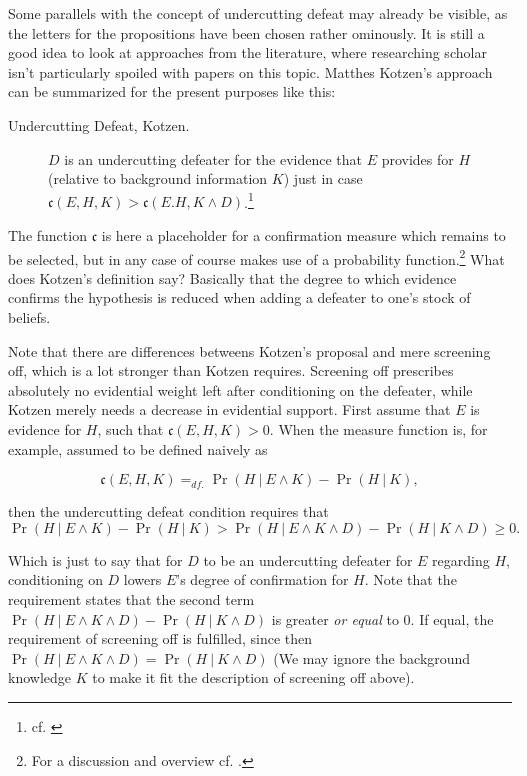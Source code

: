 \documentclass[11pt, a4paper]{scrartcl}
\newcommand{\given}[1][]{\:#1\vert\:}
\renewcommand{\i}[1]{\emph{#1}}
\begin{document}
Some parallels with the concept of undercutting defeat may already be visible, as the letters for the propositions have been chosen rather ominously. It is still a good idea to look at approaches from the literature, where researching scholar isn't particularly spoiled with papers on this topic. Matthes Kotzen's approach can be summarized for the present purposes like this:  
\begin{description}
    \item[Undercutting Defeat, Kotzen.]$D$ is an undercutting defeater for the evidence that $E$ provides for $H$ (relative to background information $K$) just in case \linebreak ${\mathfrak{c}(E, H, K) > \mathfrak{c}(E. H, K \land D)}$.\footnote{cf. \textcite[13]{Kotzen2010}}
\end{description}
The function $\mathfrak{c}$ is here a placeholder for a confirmation measure which remains to be selected, but in any case of course makes use of a probability function.\footnote{For a discussion and overview cf. \textcite{Fitelson}.} What does Kotzen's definition say? Basically that the degree to which evidence confirms the hypothesis is reduced when adding a defeater to one's stock of beliefs. 

Note that there are differences betweens Kotzen's proposal and mere screening off, which is a lot stronger than Kotzen requires. Screening off prescribes absolutely no evidential weight left after conditioning on the defeater, while Kotzen merely needs a decrease in evidential support. First assume that $E$ is evidence for $H$, such that $\mathfrak{c}(E,H,K) > 0$. When the measure function is, for example, assumed to be defined naively as 

\[\mathfrak{c}(E, H, K) =_{df.} \Pr(H \given E \land K) - \Pr(H \given K) ,\]

then the undercutting defeat condition requires that  
\begin{equation}\label{eq:undercut}
\Pr(H \given E \land K) - \Pr(H \given K)  >  \Pr(H \given E \land K \land D) - \Pr(H \given K \land D)  \geqslant 0.
\end{equation}

Which is just to say that for $D$ to be an undercutting defeater for $E$ regarding $H$, conditioning on $D$ lowers $E$'s degree of confirmation for $H$. Note that the requirement states that the second term $ \Pr(H \given E \land K \land D) - \Pr(H \given K \land D) $ is greater \i{or equal} to 0. If equal, the requirement of screening off is fulfilled, since then $\Pr(H \given E \land K \land D) = \Pr(H \given K \land D)$ (We may ignore the background knowledge $K$ to make it fit the description of screening off above).
\end{document}
